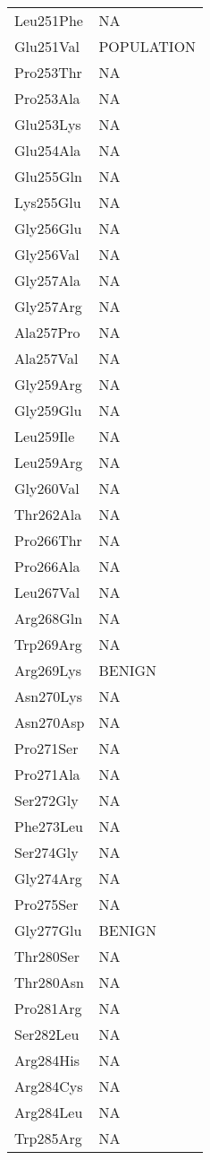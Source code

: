 \begin{longtable}[l]{l|l}
	Leu251Phe & NA \\
	Glu251Val & POPULATION \\
	Pro253Thr & NA \\
	Pro253Ala & NA \\
	Glu253Lys & NA \\
	Glu254Ala & NA \\
	Glu255Gln & NA \\
	Lys255Glu & NA \\
	Gly256Glu & NA \\
	Gly256Val & NA \\
	Gly257Ala & NA \\
	Gly257Arg & NA \\
	Ala257Pro & NA \\
	Ala257Val & NA \\
	Gly259Arg & NA \\
	Gly259Glu & NA \\
	Leu259Ile & NA \\
	Leu259Arg & NA \\
	Gly260Val & NA \\
	Thr262Ala & NA \\
	Pro266Thr & NA \\
	Pro266Ala & NA \\
	Leu267Val & NA \\
	Arg268Gln & NA \\
	Trp269Arg & NA \\
	Arg269Lys & BENIGN \\
	Asn270Lys & NA \\
	Asn270Asp & NA \\
	Pro271Ser & NA \\
	Pro271Ala & NA \\
	Ser272Gly & NA \\
	Phe273Leu & NA \\
	Ser274Gly & NA \\
	Gly274Arg & NA \\
	Pro275Ser & NA \\
	Gly277Glu & BENIGN \\
	Thr280Ser & NA \\
	Thr280Asn & NA \\
	Pro281Arg & NA \\
	Ser282Leu & NA \\
	Arg284His & NA \\
	Arg284Cys & NA \\
	Arg284Leu & NA \\
	Trp285Arg & NA \\

\end{longtable}
